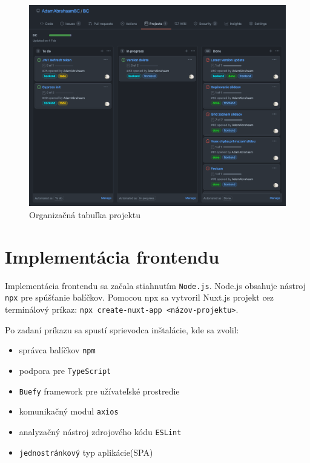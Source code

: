     \begin{figure}[!hbt]
        \centering
        \includegraphics[scale=0.3]{obrazky/board.png}
        \caption{Organizačná tabuľka projektu}
        \label{pic:board}
    \end{figure}

\section{Implementácia frontendu}
\label{impfrontend}
Implementácia frontendu sa začala stiahnutím \texttt{Node.js}. Node.js obsahuje nástroj \texttt{npx} pre spúšťanie balíčkov. Pomocou npx sa vytvoril Nuxt.js projekt cez terminálový príkaz: \texttt{npx create-nuxt-app <názov-projektu>}. 

\vspace{5mm}
Po zadaní príkazu sa spustí sprievodca inštalácie, kde sa zvolil:
    \begin{itemize}
        \item správca balíčkov \texttt{npm}
        \item podpora pre \texttt{TypeScript}
        \item \texttt{Buefy} framework pre užívateľské prostredie
        \item komunikačný modul \texttt{axios}
        \item analyzačný nástroj zdrojového kódu \texttt{ESLint} 
        \item \texttt{jednostránkový} typ aplikácie(SPA)
    \end{itemize}
    
